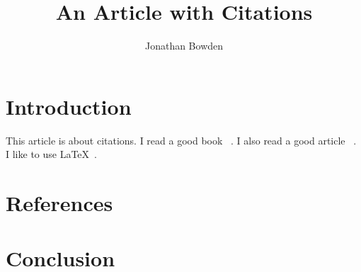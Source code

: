 \documentclass{article}
\title{An Article with Citations}
\author{Jonathan Bowden}
\begin{document}
\maketitle

\section{Introduction}
This article is about citations. I read a good book ~\cite{Bowden2018}. I also read a good article ~\cite{Smith04}. I like to use \LaTeX ~\cite{latex}.

\section{References}




\section{Conclusion}
\end{document}
